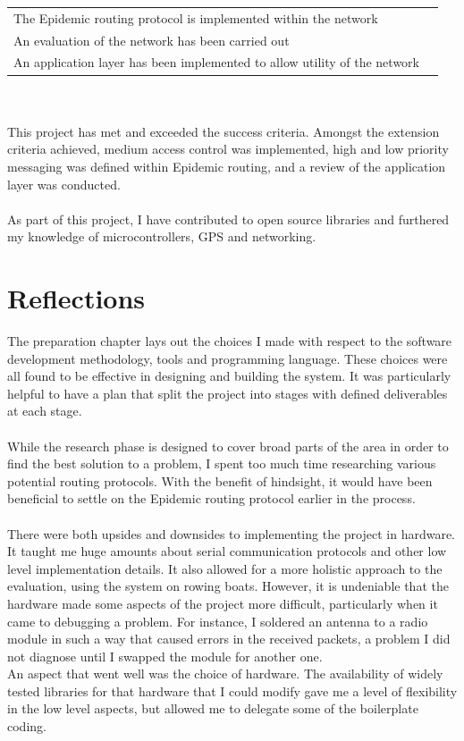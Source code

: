 \documentclass[12pt,a4paper]{report}
\begin{document}
{\begin{tabular}{ll}
The Epidemic routing protocol is implemented within the network\\
An evaluation of the network has been carried out\\
An application layer has been implemented to allow utility of the network \\
\end{tabular} \\ \\
This project has met and exceeded the success criteria. Amongst the extension criteria achieved, medium access control was implemented, high and low priority messaging was defined within Epidemic routing, and a review of the application layer was conducted. \\ \\
As part of this project, I have contributed to open source libraries and furthered my knowledge of microcontrollers, GPS and networking. 

\section{Reflections}
The preparation chapter lays out the choices I made with respect to the software development methodology, tools and programming language. These choices were all found to be effective in designing and building the system. It was particularly helpful to have a plan that split the project into stages with defined deliverables at each stage. \\ \\ 
While the research phase is designed to cover broad parts of the area in order to find the best solution to a problem, I spent too much time researching various potential routing protocols. With the benefit of hindsight, it would have been beneficial to settle on the Epidemic routing protocol earlier in the process. \\ \\
There were both upsides and downsides to implementing the project in hardware. It taught me huge amounts about serial communication protocols and other low level implementation details. It also allowed for a more holistic approach to the evaluation, using the system on rowing boats. However, it is undeniable that the hardware made some aspects of the project more difficult, particularly when it came to debugging a problem. For instance, I soldered an antenna to a radio module in such a way that caused errors in the received packets, a problem I did not diagnose until I swapped the module for another one. \\
An aspect that went well was the choice of hardware. The availability of widely tested libraries for that hardware that I could modify gave me a level of flexibility in the low level aspects, but allowed me to delegate some of the boilerplate coding. \\

}
\end{document}
